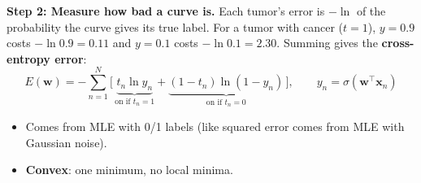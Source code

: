 \textbf{Step 2: Measure how bad a curve is.} Each tumor's error is $-\ln$ of the probability the curve gives its true label. For a tumor with cancer ($t = 1$), $y = 0.9$ costs $-\ln 0.9 = 0.11$ and $y = 0.1$ costs $-\ln 0.1 = 2.30$. Summing gives the \textbf{cross-entropy error}:
\[
E(\mathbf{w}) = -\sum_{n=1}^{N} \Big[\, \underbrace{t_n \ln y_n}_{\text{on if } t_n = 1} + \underbrace{(1 - t_n)\ln(1 - y_n)}_{\text{on if } t_n = 0} \,\Big],
\qquad y_n = \sigma(\mathbf{w}^\top\mathbf{x}_n)
\]
\begin{itemize}
  \item Comes from MLE with 0/1 labels (like squared error comes from MLE with Gaussian noise).
  \item \textbf{Convex}: one minimum, no local minima.
\end{itemize}

